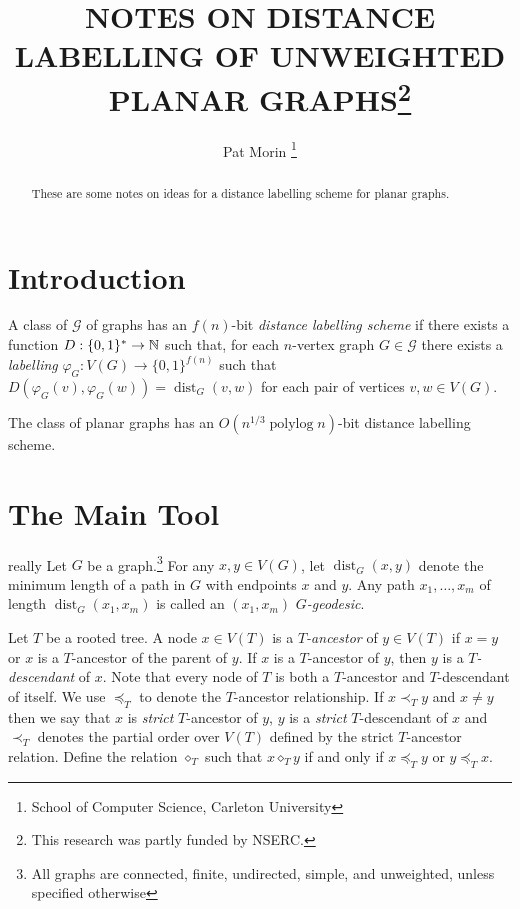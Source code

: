 \documentclass{patmorin}
\title{\MakeUppercase{Notes on Distance Labelling of Unweighted Planar Graphs}\thanks{This research was partly funded by NSERC.}}
\author{Pat Morin%
    \thanks{School of Computer Science, Carleton University}}
\DeclareMathOperator{\dist}{dist}
\DeclareMathOperator{\polylog}{polylog}
\newcommand{\comparable}{\mathbin{\diamond}}
\begin{document}
\maketitle

\begin{abstract}
    These are some notes on ideas for a distance labelling scheme for planar graphs.
\end{abstract}

\section{Introduction}

A class of $\mathcal{G}$ of graphs has an $f(n)$-bit \emph{distance labelling scheme} if there exists a function $D:\{0,1\}^*\to\mathbb{N}$ such that, for each $n$-vertex graph $G\in\mathcal{G}$ there exists a \emph{labelling} $\varphi_G:V(G)\to\{0,1\}^{f(n)}$ such that $D(\varphi_G(v),\varphi_G(w)) = \dist_G(v,w)$ for each pair of vertices $v,w\in V(G)$.

\begin{thm}\label{main}
    The class of planar graphs has an $O(n^{1/3}\polylog n)$-bit distance labelling scheme.
\end{thm}

\section{The Main Tool}
\label{main_tool}
really
Let $G$ be a graph.\footnote{All graphs are connected, finite, undirected, simple, and unweighted, unless specified otherwise}  For any $x,y\in V(G)$, let $\dist_G(x,y)$ denote the minimum length of a path in $G$ with endpoints $x$ and $y$.  Any path $x_1,\ldots,x_m$ of length $\dist_G(x_1,x_m)$ is called an $(x_1,x_m)$ \emph{$G$-geodesic}.

Let $T$ be a rooted tree.  A node $x\in V(T)$ is a \emph{$T$-ancestor} of $y\in V(T)$ if $x=y$ or $x$ is a $T$-ancestor of the parent of $y$.  If $x$ is a $T$-ancestor of $y$, then $y$ is a \emph{$T$-descendant} of $x$.  Note that every node of $T$ is both a $T$-ancestor and $T$-descendant of itself.  We use $\preceq_T$ to denote the $T$-ancestor relationship.  If $x\prec_T y$ and $x\neq y$ then we say that $x$ is \emph{strict} $T$-ancestor of $y$, $y$ is a \emph{strict} $T$-descendant of $x$ and $\prec_T$ denotes the partial order over $V(T)$ defined by the strict $T$-ancestor relation.  Define the relation $\comparable_T$ such that $x\comparable_T y$ if and only if $x\preceq_T y$ or $y\preceq_T x$.
\end{document}
